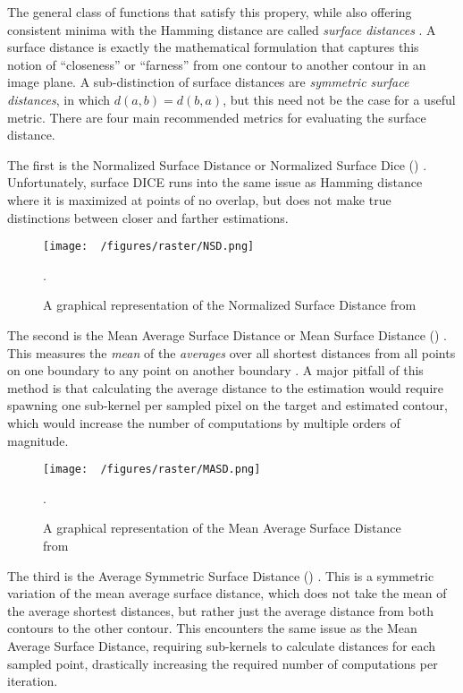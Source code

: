 The general class of functions that satisfy this propery, while also offering consistent minima with the Hamming distance are called \textit{surface distances} \cite{reinkeCommonLimitationsImage2023,reinkeUnderstandingMetricrelatedPitfalls2023}.
A surface distance is exactly the mathematical formulation that captures this notion of ``closeness'' or ``farness'' from one contour to another contour in an image plane.
A sub-distinction of surface distances are \emph{symmetric surface distances}, in which $d(a,b) = d(b,a)$, but this need not be the case for a useful metric.
There are four main recommended metrics for evaluating the surface distance.

The first is the Normalized Surface Distance or Normalized Surface Dice () \cite{nikolovClinicallyApplicableSegmentation2021} .
Unfortunately, surface DICE runs into the same issue as Hamming distance where it is maximized at points of no overlap, but does not make true distinctions between closer and farther estimations.

\begin{figure}[h!]
  \centering
  \texttt{[image: ~/figures/raster/NSD.png]}
  \caption{A graphical representation of the Normalized Surface Distance from \cite{reinkeUnderstandingMetricrelatedPitfalls2023,reinkeCommonLimitationsImage2023}}.
  \label{fig:surfDICE}
\end{figure}

The second is the Mean Average Surface Distance or Mean Surface Distance () \cite{benesPerformanceEvaluationImage2015}.
This measures the \emph{mean} of the \emph{averages} over all shortest distances from all points on one boundary to any point on another boundary \cite{reinkeCommonLimitationsImage2023,reinkeUnderstandingMetricrelatedPitfalls2023}.
A major pitfall of this method is that calculating the average distance to the estimation would require spawning one sub-kernel per sampled pixel on the target and estimated contour, which would increase the number of computations by multiple orders of magnitude.

\begin{figure}[h!]
  \centering
  \texttt{[image: ~/figures/raster/MASD.png]}
  \caption{A graphical representation of the Mean Average Surface Distance from \cite{reinkeCommonLimitationsImage2023,reinkeUnderstandingMetricrelatedPitfalls2023}}.
  \label{fig:MASD}
\end{figure}

The third is the Average Symmetric Surface Distance () \cite{yeghiazaryanFamilyBoundaryOverlap2018}.
This is a symmetric variation of the mean average surface distance, which does not take the mean of the average shortest distances, but rather just the average distance from both contours to the other contour.
This encounters the same issue as the Mean Average Surface Distance, requiring sub-kernels to calculate distances for each sampled point, drastically increasing the required number of computations per iteration.

